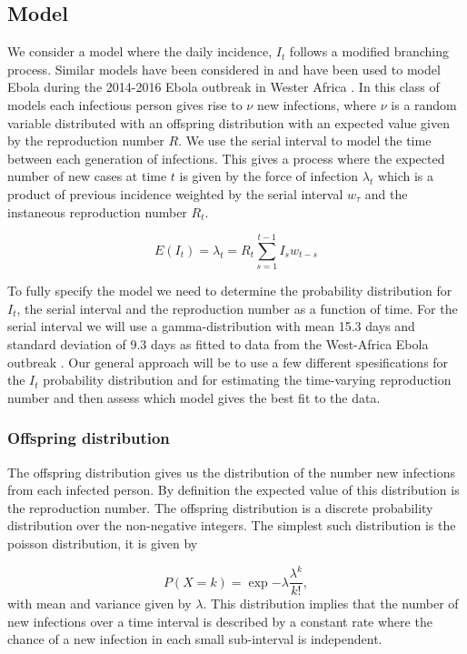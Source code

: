 \documentclass[12pt]{article}
\begin{document}
\subsection{Model}

We consider a model where the daily incidence, $I_t$ follows a modified branching process. Similar models have been considered in \cite{coriNewFrameworkSoftware2013,lloyd-smithSuperspreadingEffectIndividual2005,nouvelletSimpleApproachMeasure2018} and have been used to model Ebola during the 2014-2016 Ebola outbreak in Wester Africa \cite{EbolaVirusDisease2014, internationalebolaresponseteamExposurePatternsDriving2016}. In this class of models each infectious person gives rise to $\nu$ new infections, where $\nu$ is a random variable distributed with an offspring distribution with an expected value given by the reproduction number $R$. We use the serial interval to model the time between each generation of infections. This gives a process where the expected number of new cases at time $t$ is given by the force of infection $\lambda_t$ which is a product of previous incidence weighted by the serial interval $w_\tau$ and the instaneous reproduction number $R_t$. 

\[ E(I_t) = \lambda_t =  R_t \sum^{t-1}_{s=1} I_s w_{t-s}\]

To fully specify the model we need to determine the probability distribution for $I_t$, the serial interval and the reproduction number as a function of time. For the serial interval we will use  a gamma-distribution with mean 15.3 days and standard deviation of 9.3 days as fitted to data from the West-Africa Ebola outbreak \cite{EbolaVirusDisease2014}. Our general approach will be to use a few different spesifications for the $I_t$ probability distribution and for estimating the time-varying reproduction number and then assess which model gives the best fit to the data.

\subsubsection{Offspring distribution}
The offspring distribution gives us the distribution of the number new infections from each infected person. By definition the expected value of this distribution is the reproduction number. The offspring distribution is a discrete probability distribution over the non-negative integers. The simplest such distribution is the poisson distribution, it is given by

\[P(X=k) = \exp{-\lambda}\frac{\lambda^k}{k!}, \]
with mean and variance given by $\lambda$. This distribution implies that the number of new infections over a time interval is described by a constant rate where the chance of a new infection in each small sub-interval is independent.
\end{document}
